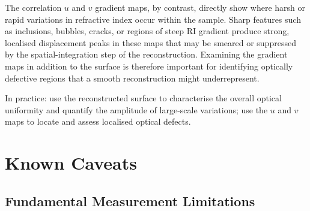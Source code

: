 \documentclass[11pt]{article}
\begin{document}
The correlation $u$ and $v$ gradient maps, by contrast, directly show
where harsh or rapid variations in refractive index occur within the
sample. Sharp features such as inclusions, bubbles, cracks, or regions
of steep RI gradient produce strong, localised displacement peaks in these
maps that may be smeared or suppressed by the spatial-integration step of
the reconstruction. Examining the gradient maps in addition to the surface
is therefore important for identifying optically defective regions that
a smooth reconstruction might underrepresent.

In practice: use the reconstructed surface to characterise the overall
optical uniformity and quantify the amplitude of large-scale variations;
use the $u$ and $v$ maps to locate and assess localised optical defects.

\section{Known Caveats}
\label{sec:caveats}

\subsection{Fundamental Measurement Limitations}
\end{document}
